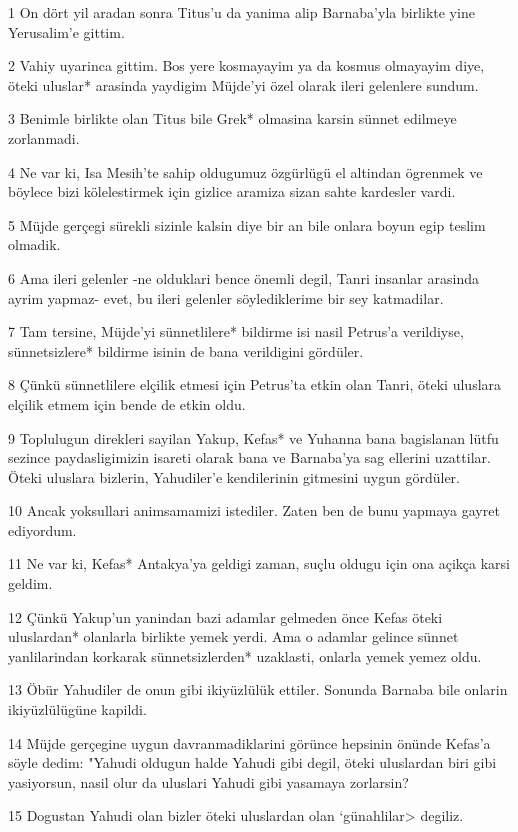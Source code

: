 \par 1 On dört yil aradan sonra Titus'u da yanima alip Barnaba'yla birlikte yine Yerusalim'e gittim.
\par 2 Vahiy uyarinca gittim. Bos yere kosmayayim ya da kosmus olmayayim diye, öteki uluslar* arasinda yaydigim Müjde'yi özel olarak ileri gelenlere sundum.
\par 3 Benimle birlikte olan Titus bile Grek* olmasina karsin sünnet edilmeye zorlanmadi.
\par 4 Ne var ki, Isa Mesih'te sahip oldugumuz özgürlügü el altindan ögrenmek ve böylece bizi kölelestirmek için gizlice aramiza sizan sahte kardesler vardi.
\par 5 Müjde gerçegi sürekli sizinle kalsin diye bir an bile onlara boyun egip teslim olmadik.
\par 6 Ama ileri gelenler -ne olduklari bence önemli degil, Tanri insanlar arasinda ayrim yapmaz- evet, bu ileri gelenler söylediklerime bir sey katmadilar.
\par 7 Tam tersine, Müjde'yi sünnetlilere* bildirme isi nasil Petrus'a verildiyse, sünnetsizlere* bildirme isinin de bana verildigini gördüler.
\par 8 Çünkü sünnetlilere elçilik etmesi için Petrus'ta etkin olan Tanri, öteki uluslara elçilik etmem için bende de etkin oldu.
\par 9 Toplulugun direkleri sayilan Yakup, Kefas* ve Yuhanna bana bagislanan lütfu sezince paydasligimizin isareti olarak bana ve Barnaba'ya sag ellerini uzattilar. Öteki uluslara bizlerin, Yahudiler'e kendilerinin gitmesini uygun gördüler.
\par 10 Ancak yoksullari animsamamizi istediler. Zaten ben de bunu yapmaya gayret ediyordum.
\par 11 Ne var ki, Kefas* Antakya'ya geldigi zaman, suçlu oldugu için ona açikça karsi geldim.
\par 12 Çünkü Yakup'un yanindan bazi adamlar gelmeden önce Kefas öteki uluslardan* olanlarla birlikte yemek yerdi. Ama o adamlar gelince sünnet yanlilarindan korkarak sünnetsizlerden* uzaklasti, onlarla yemek yemez oldu.
\par 13 Öbür Yahudiler de onun gibi ikiyüzlülük ettiler. Sonunda Barnaba bile onlarin ikiyüzlülügüne kapildi.
\par 14 Müjde gerçegine uygun davranmadiklarini görünce hepsinin önünde Kefas'a söyle dedim: "Yahudi oldugun halde Yahudi gibi degil, öteki uluslardan biri gibi yasiyorsun, nasil olur da uluslari Yahudi gibi yasamaya zorlarsin?
\par 15 Dogustan Yahudi olan bizler öteki uluslardan olan `günahlilar> degiliz.

